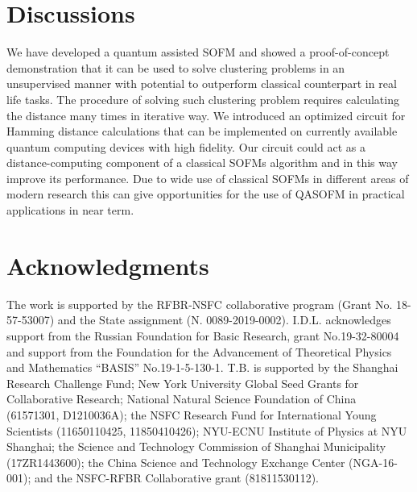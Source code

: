 \documentclass[pra,showkeys,twocolumn,showpacs]{revtex4-1}
\begin{document}
\section{Discussions}
We have developed a quantum assisted SOFM and showed a proof-of-concept demonstration that it can be used to solve clustering problems in an unsupervised manner with potential to outperform classical counterpart in real life tasks. 
The procedure of solving such clustering problem requires calculating the distance many times in iterative way. 
We introduced an optimized circuit for Hamming distance calculations that can be implemented on currently available quantum computing devices with high fidelity. 
Our circuit could act as a distance-computing component of a classical SOFMs algorithm and in this way improve its performance. 
Due to wide use of classical SOFMs in different areas of modern research this can give opportunities for the use of QASOFM in practical applications in near term.




\section*{Acknowledgments}
The work is supported by the RFBR-NSFC collaborative program (Grant No. 18-57-53007) and the State assignment (N. 0089-2019-0002). I.D.L. acknowledges support from the Russian Foundation for Basic Research, grant No.19-32-80004 and support from the Foundation for the Advancement of Theoretical Physics and Mathematics “BASIS” No.19-1-5-130-1. T.B. is supported by the Shanghai Research Challenge Fund; New York University Global Seed Grants for Collaborative Research; National Natural Science Foundation of China (61571301, D1210036A); the NSFC Research Fund for International Young Scientists (11650110425, 11850410426); NYU-ECNU Institute of Physics at NYU Shanghai; the Science and Technology Commission of Shanghai Municipality (17ZR1443600); the China Science and Technology Exchange Center (NGA-16-001); and the NSFC-RFBR Collaborative grant (81811530112).






\end{document}
